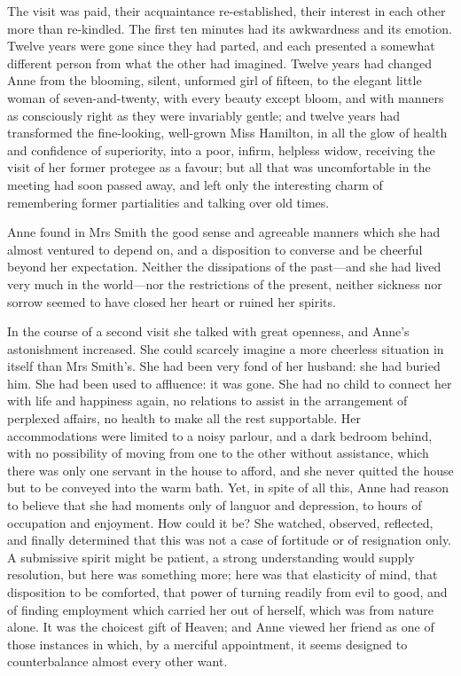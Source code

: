 The visit was paid, their acquaintance re-established, their interest in each other more than re-kindled. The first ten minutes had its awkwardness and its emotion. Twelve years were gone since they had parted, and each presented a somewhat different person from what the other had imagined. Twelve years had changed Anne from the blooming, silent, unformed girl of fifteen, to the elegant little woman of seven-and-twenty, with every beauty except bloom, and with manners as consciously right as they were invariably gentle; and twelve years had transformed the fine-looking, well-grown Miss Hamilton, in all the glow of health and confidence of superiority, into a poor, infirm, helpless widow, receiving the visit of her former protegee as a favour; but all that was uncomfortable in the meeting had soon passed away, and left only the interesting charm of remembering former partialities and talking over old times.

Anne found in Mrs Smith the good sense and agreeable manners which she had almost ventured to depend on, and a disposition to converse and be cheerful beyond her expectation. Neither the dissipations of the past—and she had lived very much in the world—nor the restrictions of the present, neither sickness nor sorrow seemed to have closed her heart or ruined her spirits.

In the course of a second visit she talked with great openness, and Anne's astonishment increased. She could scarcely imagine a more cheerless situation in itself than Mrs Smith's. She had been very fond of her husband: she had buried him. She had been used to affluence: it was gone. She had no child to connect her with life and happiness again, no relations to assist in the arrangement of perplexed affairs, no health to make all the rest supportable. Her accommodations were limited to a noisy parlour, and a dark bedroom behind, with no possibility of moving from one to the other without assistance, which there was only one servant in the house to afford, and she never quitted the house but to be conveyed into the warm bath. Yet, in spite of all this, Anne had reason to believe that she had moments only of languor and depression, to hours of occupation and enjoyment. How could it be? She watched, observed, reflected, and finally determined that this was not a case of fortitude or of resignation only. A submissive spirit might be patient, a strong understanding would supply resolution, but here was something more; here was that elasticity of mind, that disposition to be comforted, that power of turning readily from evil to good, and of finding employment which carried her out of herself, which was from nature alone. It was the choicest gift of Heaven; and Anne viewed her friend as one of those instances in which, by a merciful appointment, it seems designed to counterbalance almost every other want.


